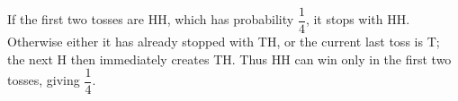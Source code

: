 If the first two tosses are HH, which has probability $\dfrac{1}{4}$, it stops with HH. Otherwise either it has already stopped with TH, or the current last toss is T; the next H then immediately creates TH. Thus HH can win only in the first two tosses, giving $\boxed{\dfrac{1}{4}}$.
